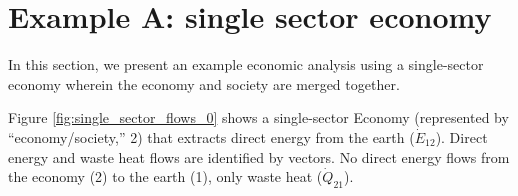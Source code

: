 %
%
%
\chapter{Example A: single sector economy}
\label{chap:single_sector} %




In this section, we present an example economic analysis using a single-sector economy wherein the economy and society are merged together.

Figure \ref{fig:single_sector_flows_0} shows a single-sector Economy (represented by ``economy/society,'' 2) that extracts direct energy from the earth ($\dot{E}_{12}$). Direct energy and waste heat flows are identified by vectors. No direct energy flows from the economy (2) to the earth (1), only waste heat ($\dot{Q}_{21}$).

